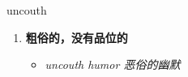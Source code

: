
\begin{frame}
{\huge uncouth}
\begin{center}
\begin{enumerate}\Large
  \item \textbf{粗俗的，没有品位的}
  \begin{itemize}
    \item \em{\Large{uncouth humor 恶俗的幽默}}
  \end{itemize}
\end{enumerate}
\end{center}
\end{frame}
